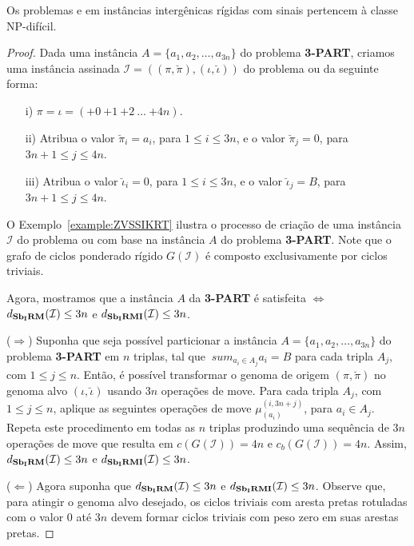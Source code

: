 \begin{theorem}\label{theorem:FETVDCDT}
Os problemas \SbIRM{} e \SbIRMI{} em instâncias intergênicas rígidas com sinais pertencem à classe NP-difícil.
\end{theorem}
\begin{proof}
Dada uma instância $A=\{a_1,a_2,\dots,a_{3n}\}$ do problema \textbf{3-PART}, criamos uma instância assinada $\mathcal{I} = ((\pi,\breve\pi ),(\iota,\breve\iota))$ do problema \SbIRM{} ou \SbIRMI{} da seguinte forma:
\begin{itemize}
    \item[i)] $\pi = \iota = ({+0}~{+1}~{+2}~\dots~{+4n})$.
    \item[ii)] Atribua o valor $\breve\pi_i = a_i$, para $1 \le i \le 3n$, e o valor $\breve\pi_j = 0$, para $3n+1 \le j \le 4n$.
    \item[iii)] Atribua o valor $\breve\iota_i = 0$, para $1 \le i \le 3n$, e o valor $\breve\iota_j = B$, para $3n+1 \le j \le 4n$.
\end{itemize}

O Exemplo~\ref{example:ZVSSIKRT} ilustra o processo de criação de uma instância $\mathcal{I}$ do problema \SbIRM{} ou \SbIRMI{} com base na instância $A$ do problema \textbf{3-PART}. Note que o grafo de ciclos ponderado rígido $G(\mathcal{I})$ é composto exclusivamente por ciclos triviais.



Agora, mostramos que a instância $A$ da \textbf{3-PART} é satisfeita $\iff$ $d_{\textbf{Sb\textsubscript{I}RM}}(\mathcal{I}) \le 3n$ e $d_{\textbf{Sb\textsubscript{I}RMI}}(\mathcal{I}) \le 3n$.

($\Rightarrow$) Suponha que seja possível particionar a instância $A=\{a_1,a_2,\dots,a_{3n}\}$ do problema \textbf{3-PART} em $n$ triplas, tal que $\ sum_{a_i \in A_j} a_i = B$ para cada tripla $A_j$, com $1\le j \le n$. Então, é possível transformar o genoma de origem $(\pi, \breve\pi)$ no genoma alvo $(\iota, \breve\iota)$ usando $3n$ operações de move. Para cada tripla $A_j$, com $1\le j \le n$, aplique as seguintes operações de move $\mu_{(a_i)}^{(i,3n+j)}$, para $a_i \in A_j$. Repeta este procedimento em todas as $n$ triplas produzindo uma sequência de $3n$ operações de move que resulta em $c(G(\mathcal{I})) = 4n$ e $c_b(G(\mathcal{I})) = 4n$. Assim, $d_{\textbf{Sb\textsubscript{I}RM}}(\mathcal{I}) \le 3n$ e $d_{\textbf{Sb\textsubscript{I}RMI}}(\mathcal{I}) \le 3n$.

($\Leftarrow$) Agora suponha que $d_{\textbf{Sb\textsubscript{I}RM}}(\mathcal{I}) \le 3n$ e $d_{\textbf{Sb\textsubscript{I}RMI}}(\mathcal{I}) \le 3n$. Observe que, para atingir o genoma alvo desejado, os ciclos triviais com aresta pretas rotuladas com o valor $0$ até $3n$ devem formar ciclos triviais com peso zero em suas arestas pretas.


\end{proof}
